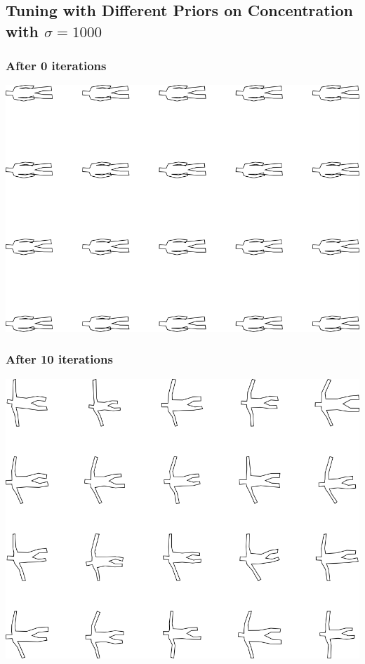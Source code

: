 \subsection{Tuning with Different Priors on Concentration with $\sigma=1000$}

\subsubsection{After 0 iterations}

\includegraphics[width=6in]{output/3.learning/concentration/concentration_psw1000_iter0_.png}
\subsubsection{After 10 iterations}

\includegraphics[width=6in]{output/3.learning/concentration/concentration_psw1000_iter10_.png}
